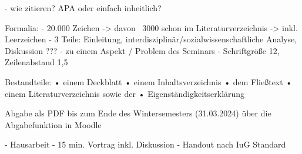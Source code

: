 - wie zitieren? APA oder einfach inheitlich?


Formalia:
- 20.000 Zeichen
-> davon ~3000 schon im Literaturverzeichnis
-> inkl. Leerzeichen
-  3 Teile: Einleitung, interdisziplinär/sozialwissenschaftliche Analyse, Diskussion ???
- zu einem Aspekt / Problem des Seminars
- Schriftgröße 12, Zeilenabstand 1,5

Bestandteile:
• einem Deckblatt
• einem Inhaltsverzeichnis
• dem Fließtext
• einem Literaturverzeichnis sowie der
• Eigenständigkeitserklärung

Abgabe
als PDF bis zum Ende des Wintersemesters (31.03.2024) über die Abgabefunktion in Moodle


- Hausarbeit
- 15 min. Vortrag inkl. Diskussion
- Handout nach IuG Standard